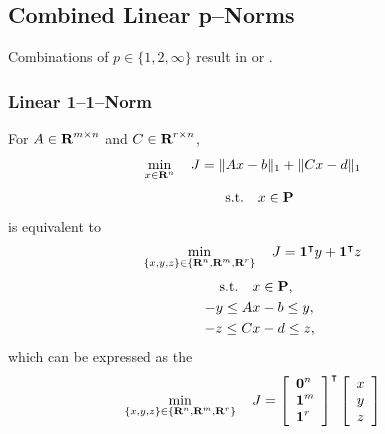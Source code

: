 \documentclass{article}
\begin{document}
\subsection{Combined Linear p--Norms}

    Combinations of $p\in\{1,2,\infty\}$ result in \LP or \QP.

\subsubsection{Linear 1--1--Norm}

    For $A\in\textbf{R}^{m\times n}$ and $C\in\textbf{R}^{r\times n}$,
    \begin{align*}
        \min_{x\in\textbf{R}^n}\quad J & = \|A x-b\|_1 + \|C x - d\|_1
    \end{align*}
    \begin{align*}
        \text{s.t.}\quad x\in\textbf{P}
    \end{align*}
    is equivalent to
    \begin{align*}
    \min_{\{x,y,z\}\in\{\textbf{R}^n,\textbf{R}^m,\textbf{R}^r\}}
    \quad J & = \textbf{1}^\intercal y + \textbf{1}^\intercal z
    \end{align*}
    \begin{align*}
        \text{s.t.}\quad &x\in\textbf{P},
        \\
        -y \leq A &x - b \leq y,\\
        -z \leq C &x - d \leq z,
    \end{align*}
    which can be expressed as the \LP
    \begin{align*}
        \min_{\{x,y,z\}\in\{\textbf{R}^n,\textbf{R}^m,\textbf{R}^r\}} \quad 
        J & = 
        \left[\begin{array}{l}
            \textbf{0}^n
            \\
            \textbf{1}^m
            \\
            \textbf{1}^r
        \end{array}\right]^\intercal
        \left[\begin{array}{c}
            x   \\
            y \\
            z
        \end{array}\right]
    \end{align*}
\end{document}
